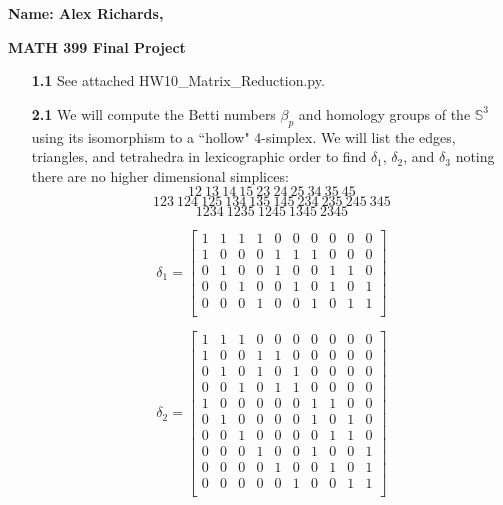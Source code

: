 \documentclass[12pt]{report}
\begin{document}
\hspace{4.5in}\textbf{Name: Alex Richards, }
\begin{center}{\large\bf MATH 399 Final Project}
\end{center}
\begin{enumerate}


\item[\bf 1.1] See attached HW10\_Matrix\_Reduction.py.

\item[\bf 2.1]  We will compute the Betti numbers $\beta_p$ and homology groups of the $\mathbb{S}^3$ using its isomorphism to a ``hollow" 4-simplex. We will list the edges, triangles, and tetrahedra in lexicographic order to find $\delta_1$, $\delta_2$, and $\delta_3$ noting there are no higher dimensional simplices:
$$12\ 13\ 14\ 15\ 23\ 24\ 25\ 34\ 35\ 45$$
$$123\ 124\ 125\ 134\ 135\ 145\ 234\ 235\ 245\ 345$$
$$1234\ 1235\ 1245\ 1345\ 2345$$



$$\delta_1=
\begin{bmatrix}
 1 & 1 & 1 & 1 & 0 & 0 & 0 & 0 & 0 & 0 \\ %
 1 & 0 & 0 & 0 & 1 & 1 & 1 & 0 & 0 & 0 \\ %
 0 & 1 & 0 & 0 & 1 & 0 & 0 & 1 & 1 & 0 \\ %
 0 & 0 & 1 & 0 & 0 & 1 & 0 & 1 & 0 & 1 \\ %
 0 & 0 & 0 & 1 & 0 & 0 & 1 & 0 & 1 & 1 \\ %
\end{bmatrix}$$

$$\delta_2=
\begin{bmatrix}
 1  & 1  & 1  & 0  & 0  & 0  & 0  & 0  & 0  & 0 \\ %
 1  & 0  & 0  & 1  & 1  & 0  & 0  & 0  & 0  & 0 \\ %
 0  & 1  & 0  & 1  & 0  & 1  & 0  & 0  & 0  & 0 \\ %
 0  & 0  & 1  & 0  & 1  & 1  & 0  & 0  & 0  & 0 \\ %
 1  & 0  & 0  & 0  & 0  & 0  & 1  & 1  & 0  & 0 \\ %
 0  & 1  & 0  & 0  & 0  & 0  & 1  & 0  & 1  & 0 \\ %
 0  & 0  & 1  & 0  & 0  & 0  & 0  & 1  & 1  & 0 \\ %
 0  & 0  & 0  & 1  & 0  & 0  & 1  & 0  & 0  & 1 \\ %
 0  & 0  & 0  & 0  & 1  & 0  & 0  & 1  & 0  & 1 \\ %
 0  & 0  & 0  & 0  & 0  & 1  & 0  & 0  & 1  & 1 \\ %
\end{bmatrix}$$


\end{enumerate}
\end{document}
